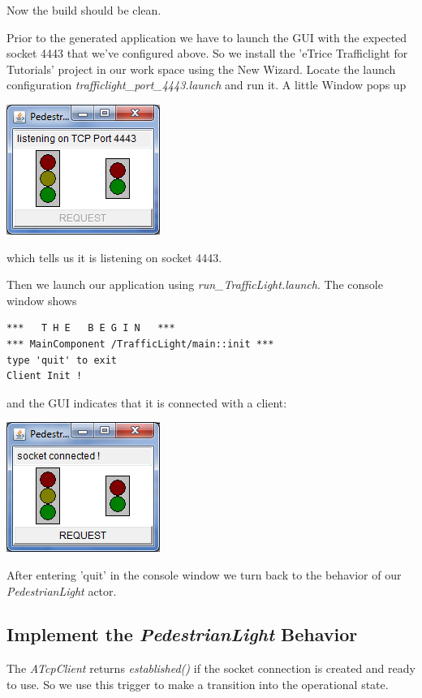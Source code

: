 Now the build should be clean.

Prior to the generated application we have to launch the GUI with the expected socket 4443 that we've configured above.
So we install the 'eTrice Trafficlight for Tutorials' project in our work space using the New Wizard.
Locate the launch configuration \textit{trafficlight\_port\_4443.launch} and run it. A little Window pops up

\includegraphics{images/018-trafficlightGUI.png}

which tells us it is listening on socket 4443.

Then we launch our application using \textit{run\_TrafficLight.launch}.
The console window shows

\begin{verbatim}
***   T H E   B E G I N   ***
*** MainComponent /TrafficLight/main::init ***
type 'quit' to exit
Client Init !
\end{verbatim}

and the GUI indicates that it is connected with a client:

\includegraphics{images/018-trafficlightGUI-connected.png}

After entering 'quit' in the console window we turn back to the behavior of our \textit{PedestrianLight} actor.

\subsection{Implement the \textit{PedestrianLight} Behavior}

The \textit{ATcpClient} returns \textit{established()} if the socket connection is created and ready to use.
So we use this trigger to make a transition into the operational state.

